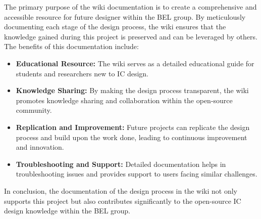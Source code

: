 The primary purpose of the wiki documentation is to create a comprehensive and accessible resource for future designer within the BEL group. 
By meticulously documenting each stage of the design process, the wiki ensures that the knowledge gained during this project is preserved and can be leveraged by others. The benefits of this documentation include:

\begin{itemize}
    \item \textbf{Educational Resource:} The wiki serves as a detailed educational guide for students and researchers new to IC design.
    \item \textbf{Knowledge Sharing:} By making the design process transparent, the wiki promotes knowledge sharing and collaboration within the open-source community.
    \item \textbf{Replication and Improvement:} Future projects can replicate the design process and build upon the work done, leading to continuous improvement and innovation.
    \item \textbf{Troubleshooting and Support:} Detailed documentation helps in troubleshooting issues and provides support to users facing similar challenges.
\end{itemize}

In conclusion, the documentation of the design process in the wiki not only supports this project but also contributes significantly to the open-source IC design knowledge within the BEL group.